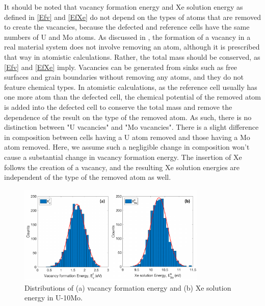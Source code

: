 \documentclass[review]{elsarticle}
\providecommand{\DIFaddtex}[1]{{\protect\color{blue} \sf #1}} %
\providecommand{\DIFaddbegin}{} %
\providecommand{\DIFaddend}{} %
\providecommand{\DIFaddbeginFL}{} %
\providecommand{\DIFaddendFL}{} %
\providecommand{\DIFdelbeginFL}{} %
\providecommand{\DIFdelendFL}{} %
\providecommand{\DIFadd}[1]{\texorpdfstring{\DIFaddtex{#1}}{#1}} %
\newcommand{\DIFscaledelfig}{0.5}
\newlength{\DIFdelgraphicswidth} %
\newlength{\DIFdelgraphicsheight} %
\newcommand{\DIFaddincludegraphics}[2][]{{\color{blue}\fbox{\DIFOincludegraphics[#1]{#2}}}} %
\newcommand{\DIFdelincludegraphics}[2][]{%
\sbox{\DIFdelgraphicsbox}{\DIFOincludegraphics[#1]{#2}}%
\settoboxwidth{\DIFdelgraphicswidth}{\DIFdelgraphicsbox} %
\settoboxtotalheight{\DIFdelgraphicsheight}{\DIFdelgraphicsbox} %
\scalebox{\DIFscaledelfig}{%
\parbox[b]{\DIFdelgraphicswidth}{\usebox{\DIFdelgraphicsbox}\\[-\baselineskip] \rule{\DIFdelgraphicswidth}{0em}}\llap{\resizebox{\DIFdelgraphicswidth}{\DIFdelgraphicsheight}{%
\setlength{\unitlength}{\DIFdelgraphicswidth}%
\begin{picture}(1,1)%
\thicklines\linethickness{2pt} %
{\color[rgb]{1,0,0}\put(0,0){\framebox(1,1){}}}%
{\color[rgb]{1,0,0}\put(0,0){\line( 1,1){1}}}%
{\color[rgb]{1,0,0}\put(0,1){\line(1,-1){1}}}%
\end{picture}%
}\hspace*{3pt}}} %
} %
\DeclareRobustCommand{\DIFaddbegin}{\DIFOaddbegin \let\includegraphics\DIFaddincludegraphics} %
\DeclareRobustCommand{\DIFaddend}{\DIFOaddend \let\includegraphics\DIFOincludegraphics} %
\DeclareRobustCommand{\DIFaddbeginFL}{\DIFOaddbeginFL \let\includegraphics\DIFaddincludegraphics} %
\DeclareRobustCommand{\DIFaddendFL}{\DIFOaddendFL \let\includegraphics\DIFOincludegraphics} %
\DeclareRobustCommand{\DIFdelbeginFL}{\DIFOdelbeginFL \let\includegraphics\DIFdelincludegraphics} %
\DeclareRobustCommand{\DIFdelendFL}{\DIFOaddendFL \let\includegraphics\DIFOincludegraphics} %
\begin{document}
\DIFaddbegin \DIFadd{It should be noted that vacancy formation energy and Xe solution energy as defined in \cref{Efv} and \cref{EfXe} do not depend on the types of atoms that are removed to create the vacancies, because the defected and reference cells have the same numbers of U and Mo atoms. As discussed in \cite{zhang2021,morgan2020}, the formation of a vacancy in a real material system does not involve removing an atom, although it is prescribed that way in atomistic calculations. Rather, the total mass should be conserved, as \cref{Efv} and \cref{EfXe} imply. Vacancies can be generated from sinks such as free surfaces and grain boundaries without removing any atoms, and they do not feature chemical types. In atomistic calculations, as the reference cell usually has one more atom than the defected cell, the chemical potential of the removed atom is added into the defected cell to conserve the total mass and remove the dependence of the result on the type of the removed atom. As such, there is no distinction between "U vacancies" and "Mo vacancies". There is a slight difference in composition between cells having a U atom removed and those having a Mo atom removed. Here, we assume such a negligible change in composition won’t cause a substantial change in vacancy formation energy. The insertion of Xe follows the creation of a vacancy, and the resulting Xe solution energies are independent of the type of the removed atom as well. 
}

\DIFaddend \begin{figure}[h!]
 \centering
 \DIFdelbeginFL %
\DIFdelendFL \DIFaddbeginFL \includegraphics[width=0.8\textwidth]{EvF} 
 \DIFaddendFL \caption{Distributions of (a) vacancy formation energy and (b) Xe solution energy in U-10Mo. }
 \label{fig:Evf}
\end{figure}
\end{document}
